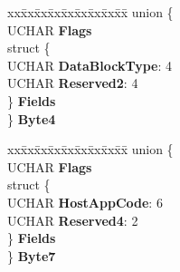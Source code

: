 \begin{DoxyCompactItemize}
\begin{tabbing}
\end{tabbing}\item 
\mbox{\label{struct___m_o_d_e___w_r_i_t_e___p_a_r_a_m_s___p_a_g_e_ac4ceb90ecdb8cf5f420dab73d06bf13a}} 
\begin{tabbing}
xx\=xx\=xx\=xx\=xx\=xx\=xx\=xx\=xx\=\kill
union \{\\
\>UCHAR {\bfseries Flags}\\
\>struct \{\\
\>\>UCHAR {\bfseries DataBlockType}: 4\\
\>\>UCHAR {\bfseries Reserved2}: 4\\
\>\} {\bfseries Fields}\\
\} {\bfseries Byte4}\\

\end{tabbing}\item 
\mbox{\label{struct___m_o_d_e___w_r_i_t_e___p_a_r_a_m_s___p_a_g_e_a8caa9e7d8ef268723c137011d7a33eeb}} 
\begin{tabbing}
xx\=xx\=xx\=xx\=xx\=xx\=xx\=xx\=xx\=\kill
union \{\\
\>UCHAR {\bfseries Flags}\\
\>struct \{\\
\>\>UCHAR {\bfseries HostAppCode}: 6\\
\>\>UCHAR {\bfseries Reserved4}: 2\\
\>\} {\bfseries Fields}\\
\} {\bfseries Byte7}\\


\end{tabbing}
\end{DoxyCompactItemize}
